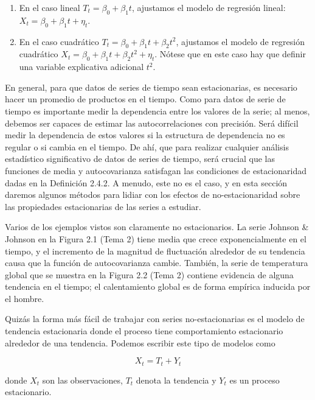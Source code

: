 \documentclass[12pt,]{krantz}
\providecommand{\tightlist}{%
  \setlength{\itemsep}{0pt}\setlength{\parskip}{0pt}}
\theoremstyle{definition}
\theoremstyle{definition}
\theoremstyle{definition}
\theoremstyle{remark}
\begin{document}
\begin{enumerate}
\def\labelenumi{\arabic{enumi}.}
\tightlist
\item
  En el caso lineal \(T_t = \beta_0 + \beta_1t\), ajustamos el modelo de
  regresión lineal: \(X_t = \beta_0 + \beta_1t + \eta_t\).
\item
  En el caso cuadrático \(T_t = \beta_0 +\beta_1t+\beta_2t^2\),
  ajustamos el modelo de regresión cuadrático
  \(X_t = \beta_0+\beta_1t+\beta_2t^2 +\eta_t\). Nótese que en este caso
  hay que definir una variable explicativa adicional \(t^2\).
\end{enumerate}

En general, para que datos de series de tiempo sean estacionarias, es
necesario hacer un promedio de productos en el tiempo. Como para datos
de serie de tiempo es importante medir la dependencia entre los valores
de la serie; al menos, debemos ser capaces de estimar las
autocorrelaciones con precisión. Será difícil medir la dependencia de
estos valores si la estructura de dependencia no es regular o si cambia
en el tiempo. De ahí, que para realizar cualquier análisis estadístico
significativo de datos de series de tiempo, será crucial que las
funciones de media y autocovarianza satisfagan las condiciones de
estacionaridad dadas en la Definición 2.4.2. A menudo, este no es el
caso, y en esta sección daremos algunos métodos para lidiar con los
efectos de no-estacionaridad sobre las propiedades estacionarias de las
series a estudiar.

Varios de los ejemplos vistos son claramente no estacionarios. La serie
Johnson \& Johnson en la Figura 2.1 (Tema 2) tiene media que crece
exponencialmente en el tiempo, y el incremento de la magnitud de
fluctuación alrededor de su tendencia causa que la función de
autocovarianza cambie. También, la serie de temperatura global que se
muestra en la Figura 2.2 (Tema 2) contiene evidencia de alguna tendencia
en el tiempo; el calentamiento global es de forma empírica inducida por
el hombre.

Quizás la forma más fácil de trabajar con series no-estacionarias es el
modelo de tendencia estacionaria donde el proceso tiene comportamiento
estacionario alrededor de una tendencia. Podemos escribir este tipo de
modelos como

\begin{equation}
X_t=T_t+Y_t
\label{eq:eq-modelo-tendencia-estacionaria}
\end{equation}

donde \(X_t\) son las observaciones, \(T_t\) denota la tendencia y
\(Y_t\) es un proceso estacionario.
\end{document}
